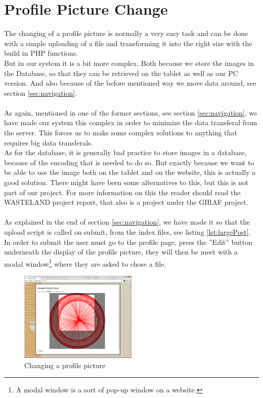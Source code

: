 \section{Profile Picture Change}
\label{sec:profilePicChange}
The changing of a profile picture is normally a very easy task and can be done with a simple uploading of a file and transforming it into the right size with the build in PHP functions.\\
But in our system it is a bit more complex. Both because we store the images in the Database, so that they can be retrieved on the tablet as well as our PC version. And also because of the before mentioned way we move data around, see section \ref{sec:navigation}.\\
\\
As again, mentioned in one of the former sections, see section \ref{sec:navigation}, we have made our system this complex in order to minimize the data transferal from the server. This forces us to make some complex solutions to anything that requires big data transferals.\\
As for the database, it is generally bad practice to store images in a database, because of the encoding that is needed to do so. But exactly because we want to be able to use the image both on the tablet and on the website, this is actually a good solution. There might have been some alternatives to this, but this is not part of our project. For more information on this the reader should read the WASTELAND project report, that also is a project under the GIRAF project.\\
\\	
As explained in the end of section \ref{sec:navigation}, we have made it so that the upload script is called on submit, from the index files, see listing \ref{lst:largePost}.\\
In order to submit the user must go to the profile page, press the ''Edit'' button underneath the display of the profile picture, they will then be meet with a modal window\footnote{A modal window is a sort of pop-up window on a website.} where they are asked to chose a file.

\begin{figure}[htbp]
	\centering
		\includegraphics[width=0.50\textwidth]{images/profilePicChange.png}
	\caption{Changing a profile picture}
	\label{fig:profilePicChange}
\end{figure}

